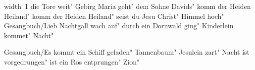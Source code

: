 \ifx\mxversion\undefined
  
  
  
  
\fi

%
\hbox{\pdfximage width 1\pdfrefximage\pdflastximage}\vfill\eject
\tableofcontents
\normalmusicsize
 die Tore weit"
 Gebirg Maria geht"
 dem Sohne Davids"
 komm der Heiden Heiland"
 komm der Heiden Heiland"
 seist du Jesu Christ"
 Himmel hoch"
 Gesangbuch/Lieb Nachtgall wach auf"
 durch ein Dornwald ging"
 Kinderlein kommet"
 Nacht"

 Gesangbuch/Es kommt ein Schiff geladen"
 Tannenbaum"
\makeatletter
{}
\makeatother
 Jesulein zart"
\makeatletter
{}
\makeatother
 Nacht ist vorgedrungen"
 ist ein Ros entprungen"
\makeatletter
{}
\makeatother
 Zion"
\bookbye